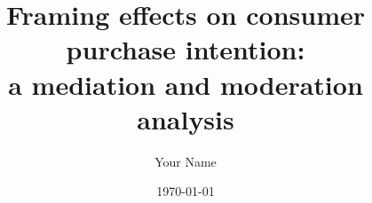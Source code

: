 \documentclass[11pt]{article}
\title{Framing effects on consumer purchase intention: \\
       a mediation and moderation analysis}
\author{Your Name}
\date{\today}
\begin{document}
\maketitle

\begin{abstract}

\end{abstract}








\end{document}
